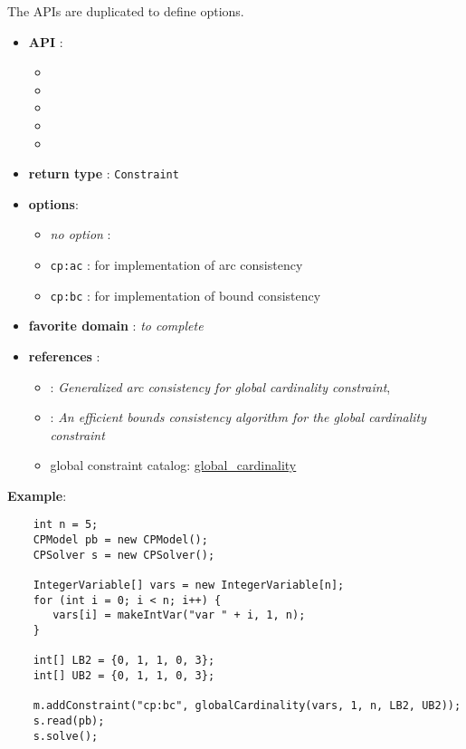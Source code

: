 The APIs are duplicated to define options. 

\begin{itemize}
	\item \textbf{API} :
      \begin{itemize}
	\item {}
	\item {}
	\item {}
	\item {}
	\item {}
      \end{itemize}
	\item \textbf{return type} : \texttt{Constraint}
	\item \textbf{options}:
	\begin{itemize}
		\item \emph{no option} :
		\item \texttt{cp:ac} : for \cite{ReginAAAI96} implementation of arc consistency
		\item \texttt{cp:bc} : for  \cite{QuimperCP03} implementation of bound consistency
	\end{itemize}
	\item \textbf{favorite domain} : \emph{to complete}
	\item \textbf{references} :
      \begin{itemize}
      \item \cite{ReginAAAI96}: \emph{Generalized arc consistency for global cardinality constraint},
      \item \cite{QuimperCP03}: \emph{An efficient bounds consistency algorithm for the global cardinality constraint}
      \item global constraint catalog: \href{http://www.emn.fr/x-info/sdemasse/gccat/Cglobal_cardinality.html}{global\_cardinality}
      \end{itemize}
\end{itemize}

\textbf{Example}:
\begin{lstlisting}
	int n = 5;
	CPModel pb = new CPModel();
	CPSolver s = new CPSolver();
	
	IntegerVariable[] vars = new IntegerVariable[n];
	for (int i = 0; i < n; i++) {
	   vars[i] = makeIntVar("var " + i, 1, n);
	}
	
	int[] LB2 = {0, 1, 1, 0, 3};
	int[] UB2 = {0, 1, 1, 0, 3};
	
	m.addConstraint("cp:bc", globalCardinality(vars, 1, n, LB2, UB2));
	s.read(pb);
	s.solve();
\end{lstlisting}
